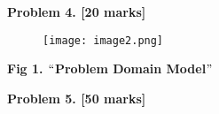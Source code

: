 \documentclass[12pt]{article}
\begin{document}
\begin{table}[H]
\begin{tabular}{p{4.51in}p{1.54in}}
\end{tabular}
 \end{table}




\vspace{\baselineskip}

\vspace{\baselineskip}

\vspace{\baselineskip}

\vspace{\baselineskip}

\vspace{\baselineskip}
\begin{justify}
{\fontsize{14pt}{16.8pt}\selectfont \textbf{Problem 4. [20 marks]}\par}
\end{justify}\par




\begin{figure}[H]
	\begin{Center}
		\texttt{[image: image2.png]}
	\end{Center}
\end{figure}



\begin{justify}
 
\end{justify}\par

\begin{Center}
\textbf{Fig 1. $``$Problem Domain Model$"$ }
\end{Center}\par


\vspace{\baselineskip}

\vspace{\baselineskip}
\begin{justify}
{\fontsize{14pt}{16.8pt}\selectfont \textbf{Problem 5. [50 marks]}\par}
\end{justify}\par
\end{document}
